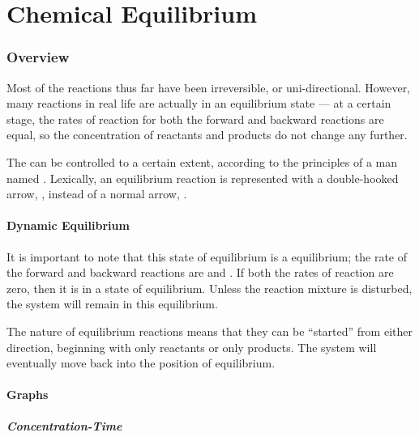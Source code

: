 

\pagebreak
\part{Chemical Equilibrium}

	\section{Overview}

		Most of the reactions thus far have been irreversible, or uni-directional. However, many reactions in real life are actually in an
		equilibrium state --- at a certain stage, the rates of reaction for both the forward and backward reactions are equal, so the
		concentration of reactants and products do not change any further.

		The  can be controlled to a certain extent, according to the principles of a man named
		. Lexically, an equilibrium reaction is represented with a double-hooked arrow, \ch{>=<}, instead of a normal
		arrow, \ch{->}.

		\subsection{Dynamic Equilibrium}

			It is important to note that this state of equilibrium is a  equilibrium; the rate of the forward and backward
			reactions are  and . If both the rates of reaction are zero, then it is in a state of 
			equilibrium. Unless the reaction mixture is disturbed, the system will remain in this equilibrium.

			The nature of equilibrium reactions means that they can be ``started'' from either direction, beginning with only reactants or
			only products. The system will eventually move back into the position of equilibrium.


		\pagebreak
		\subsection{Graphs}

			\subsubsection{Concentration-Time}

